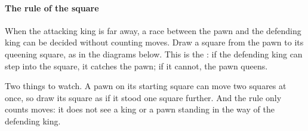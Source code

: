 
\paragraph{The rule of the square}\label{rule-of-the-square}
When the attacking king is far away, a race between the pawn and the defending king can be
decided without counting moves. Draw a square from the pawn to its queening square, as in the
diagrams below. This is the : if the defending king can step into the
square, it catches the pawn; if it cannot, the pawn queens.



Two things to watch. A pawn on its starting square can move two squares at once, so draw its
square as if it stood one square further. And the rule only counts moves: it does not see a king
or a pawn standing in the way of the defending king.
